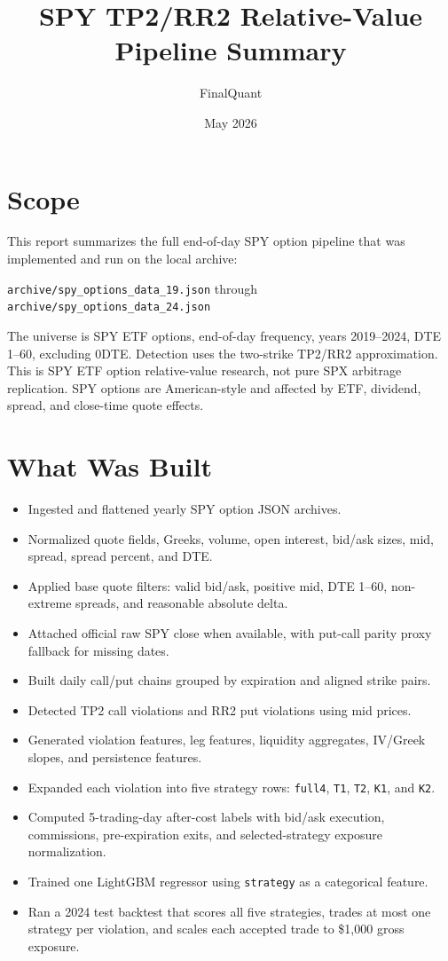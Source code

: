 \documentclass[11pt]{article}
\title{SPY TP2/RR2 Relative-Value Pipeline Summary}
\author{FinalQuant}
\date{May 2026}
\begin{document}
\maketitle

\section{Scope}

This report summarizes the full end-of-day SPY option pipeline that was implemented and run on the local archive:

\begin{center}
\texttt{archive/spy\_options\_data\_19.json} through \texttt{archive/spy\_options\_data\_24.json}
\end{center}

The universe is SPY ETF options, end-of-day frequency, years 2019--2024, DTE 1--60, excluding 0DTE. Detection uses the two-strike TP2/RR2 approximation. This is SPY ETF option relative-value research, not pure SPX arbitrage replication. SPY options are American-style and affected by ETF, dividend, spread, and close-time quote effects.

\section{What Was Built}

\begin{itemize}
  \item Ingested and flattened yearly SPY option JSON archives.
  \item Normalized quote fields, Greeks, volume, open interest, bid/ask sizes, mid, spread, spread percent, and DTE.
  \item Applied base quote filters: valid bid/ask, positive mid, DTE 1--60, non-extreme spreads, and reasonable absolute delta.
  \item Attached official raw SPY close when available, with put-call parity proxy fallback for missing dates.
  \item Built daily call/put chains grouped by expiration and aligned strike pairs.
  \item Detected TP2 call violations and RR2 put violations using mid prices.
  \item Generated violation features, leg features, liquidity aggregates, IV/Greek slopes, and persistence features.
  \item Expanded each violation into five strategy rows: \texttt{full4}, \texttt{T1}, \texttt{T2}, \texttt{K1}, and \texttt{K2}.
  \item Computed 5-trading-day after-cost labels with bid/ask execution, commissions, pre-expiration exits, and selected-strategy exposure normalization.
  \item Trained one LightGBM regressor using \texttt{strategy} as a categorical feature.
  \item Ran a 2024 test backtest that scores all five strategies, trades at most one strategy per violation, and scales each accepted trade to \$1,000 gross exposure.
\end{itemize}
\end{document}
